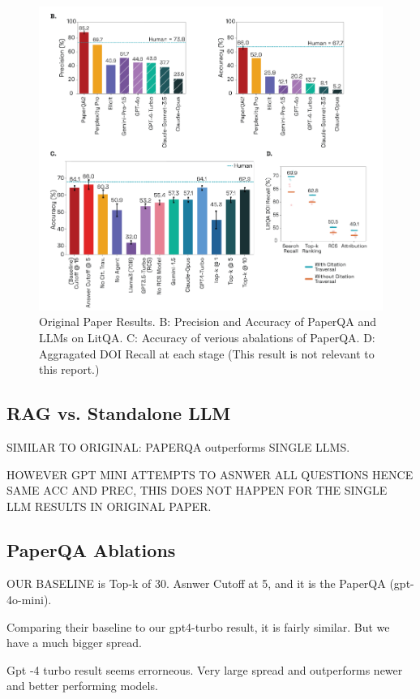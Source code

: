 \begin{figure}[H]
    \centering
    \includegraphics[width=\textwidth]{figures/original_result.png}
    \caption{Original Paper Results. B: Precision and Accuracy of PaperQA and LLMs on LitQA. C: Accuracy of verious abalations of PaperQA. D: Aggragated DOI Recall at each stage (This result is not relevant to this report.)}
    \label{fig:original_result}
\end{figure}

\subsection{RAG vs. Standalone LLM}

SIMILAR TO ORIGINAL: PAPERQA outperforms SINGLE LLMS. 

HOWEVER GPT MINI ATTEMPTS TO ASNWER ALL QUESTIONS HENCE SAME ACC AND PREC, THIS DOES NOT HAPPEN FOR THE SINGLE LLM RESULTS IN ORIGINAL PAPER. 


\subsection{PaperQA Ablations}
OUR BASELINE is Top-k of 30. Asnwer Cutoff at 5, and it is the PaperQA (gpt-4o-mini). 

Comparing their baseline to our gpt4-turbo result, it is fairly similar. But we have a much bigger spread. 

Gpt -4 turbo result seems errorneous. Very large spread and outperforms newer and better performing models. 

